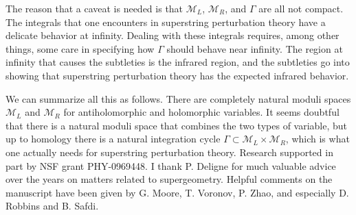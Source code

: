 \documentclass[11pt,a4paper]{article}
\def\M{{\mathcal M}}
\begin{document}
The reason that a caveat is needed is that $\M_L$, $\M_R$, and $\varGamma$ are all not compact.  The integrals
that one encounters in superstring perturbation theory have a delicate behavior at infinity.  Dealing with these integrals
requires, among other things, some care in specifying how $\varGamma$ should behave near infinity. The region at infinity
that causes the subtleties is the infrared region, and the subtleties go into showing that superstring perturbation theory has
the expected infrared behavior.

We can summarize all this as follows.
 There are completely natural moduli spaces $\M_L$ and $\M_R$ for antiholomorphic and holomorphic variables.  It seems
 doubtful that there is a natural
 moduli space that combines the two types of variable, but up to homology there is a natural integration cycle $\varGamma\subset \M_L\times \M_R$, which is what
one actually needs for superstring perturbation theory. 
\vskip 1cm
 Research  supported in part by NSF grant  PHY-0969448.  I thank P. Deligne for much valuable advice
over the years on matters related to supergeometry.  Helpful comments on the manuscript have been given by  G. Moore,
T. Voronov,
  P. Zhao, and especially D. Robbins and  B. Safdi.
\end{document}
